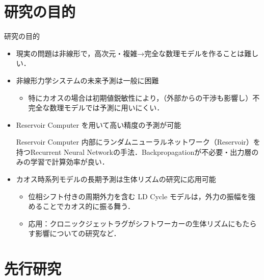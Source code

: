 \section{研究の目的}

\begin{frame}{研究の目的}
    
    \begin{itemize}
        \item 現実の問題は非線形で，高次元・複雑→完全な数理モデルを作ることは難しい．
        \item 非線形力学システムの未来予測は一般に困難
        \begin{itemize}
            \item 特にカオスの場合は初期値鋭敏性により，（外部からの干渉も影響し）不完全な数理モデルでは予測に用いにくい．
        \end{itemize}
        \item Reservoir Computer を用いて高い精度の予測が可能
        \begin{block}{Reservoir Computer}
            内部にランダムニューラルネットワーク（Reservoir）を持つRecurrent Neural Networkの手法．Backpropagationが不必要・出力層のみの学習で計算効率が良い． 
        \end{block}    
        \item カオス時系列モデルの長期予測は生体リズムの研究に応用可能\begin{itemize}
            \item 位相シフト付きの周期外力を含む LD Cycle モデルは，外力の振幅を強めることでカオス的に振る舞う．
            \item 応用：クロニックジェットラグがシフトワーカーの生体リズムにもたらす影響についての研究など．
        \end{itemize}
    \end{itemize}      
\end{frame}

\section{先行研究}  

